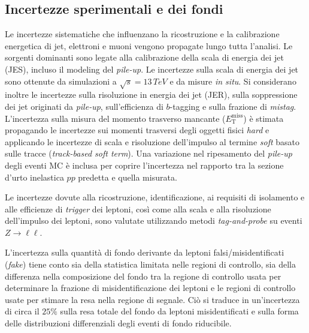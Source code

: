\documentclass[11pt]{article}
\begin{document}
\subsection{Incertezze sperimentali e dei fondi}
Le incertezze sistematiche che influenzano la ricostruzione e la calibrazione energetica di jet, elettroni e muoni vengono propagate lungo tutta l'analisi. Le sorgenti dominanti sono legate alla calibrazione della scala di energia dei jet (JES), incluso il modeling del \textit{pile-up}. Le incertezze sulla scala di energia dei jet sono ottenute da simulazioni a $\sqrt{s} = 13\,\unit{TeV}$ e da misure \textit{in situ}. Si considerano inoltre le incertezze sulla risoluzione in energia dei jet (JER), sulla soppressione dei jet originati da \textit{pile-up}, sull'efficienza di $b$-tagging e sulla frazione di \textit{mistag}. L'incertezza sulla misura del momento trasverso mancante ($E_{\mathrm{T}}^{\mathrm{miss}}$) è stimata propagando le incertezze sui momenti trasversi degli oggetti fisici \textit{hard} e applicando le incertezze di scala e risoluzione dell'impulso al termine \textit{soft} basato sulle tracce (\textit{track-based soft term}). Una variazione nel ripesamento del \textit{pile-up} degli eventi MC è inclusa per coprire l'incertezza nel rapporto tra la sezione d'urto inelastica $pp$ predetta e quella misurata.

Le incertezze dovute alla ricostruzione, identificazione, ai requisiti di isolamento e alle efficienze di \textit{trigger} dei leptoni, così come alla scala e alla risoluzione dell'impulso dei leptoni, sono valutate utilizzando metodi \textit{tag-and-probe} su eventi $Z \to \ell\ell$.

L'incertezza sulla quantità di fondo derivante da leptoni falsi/misidentificati (\textit{fake}) tiene conto sia della statistica limitata nelle regioni di controllo, sia della differenza nella composizione del fondo tra la regione di controllo usata per determinare la frazione di misidentificazione dei leptoni e le regioni di controllo usate per stimare la resa nella regione di segnale. Ciò si traduce in un'incertezza di circa il $25\%$ sulla resa totale del fondo da leptoni misidentificati e sulla forma delle distribuzioni differenziali degli eventi di fondo riducibile.
\end{document}

